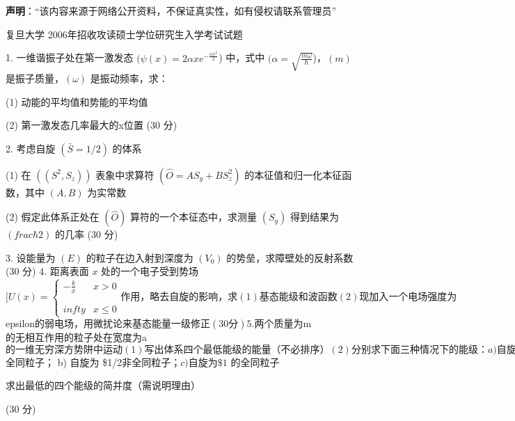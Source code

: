 

\textbf{声明}：“该内容来源于网络公开资料，不保证真实性，如有侵权请联系管理员”

复旦大学 2006年招收攻读硕士学位研究生入学考试试题

1. 一维谐振子处在第一激发态 $( \psi (x) = 2 \alpha x e^{-\frac{\alpha x^2}{2}} $) 中，式中 $( \alpha = \sqrt{\frac{m \omega}{\hbar}}$)，$( m )$ 是振子质量，$(\omega)$ 是振动频率，求：

(1) 动能的平均值和势能的平均值

(2) 第一激发态几率最大的x位置 (30 分)

2. 考虑自旋 $(\bar{S} = 1/2)$ 的体系

(1) 在 $((S^2, S_z))$ 表象中求算符 $(\hat{O} = A S_y + B S_z^2 )$ 的本征值和归一化本征函数，其中 $( A, B )$ 为实常数

(2) 假定此体系正处在 $(\hat{O})$ 算符的一个本征态中，求测量 $( S_y )$ 得到结果为 $(frac{\hbar}{2})$ 的几率 (30 分)

3. 设能量为 $( E )$ 的粒子在边入射到深度为 $( V_0 )$ 的势垒，求障壁处的反射系数 (30 分)
4. 距离表面 $x$ 处的一个电子受到势场
 $[U(x) = \begin{cases} -\frac{k}{x} & x > 0 \\\\\\infty & x \leq 0\end{cases}
作用，略去自旋的影响，求
(1) 基态能级和波函数
(2) 现加入一个电场强度为 $\\epsilon$ 的弱电场，用微扰论来基态能量一级修正

(30 分)

5. 两个质量为 $m$ 的无相互作用的粒子处在宽度为 $a$ 的一维无穷深方势阱中运动
(1) 写出体系四个最低能级的能量（不必排序）
(2) 分别求下面三种情况下的能级：
a) 自旋为 \$1/2$ 全同粒子；
b) 自旋为 \$1/2$ 非全同粒子；
c) 自旋为 \$1$ 的全同粒子

求出最低的四个能级的简并度（需说明理由）

(30 分)